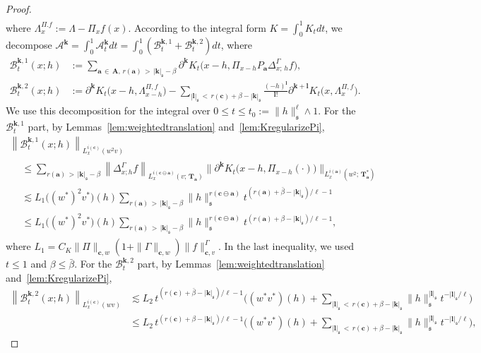 \documentclass[AHL,Unicode,longabstracts,published]{cedram}
\newcommand{\mfs}{\mathfrak{s}}
\newcommand{\wco}{w^*}
\newcommand{\vco}{v^*}
\newcommand{\bfa}{\mathbf{a}}
\newcommand{\bfc}{\mathbf{c}}
\newcommand{\bfcoa}{\mathbf{c}\ominus\mathbf{a}}
\newcommand{\bfA}{\mathbf{A}}
\newcommand{\bfT}{\mathbf{T}}
\newcommand{\bfk}{\mathbf{k}}
\newcommand{\bfl}{\mathbf{l}}
\newcommand{\mcA}{\mathcal{A}}
\newcommand{\mcB}{\mathcal{B}}
\begin{document}
\begin{proof}
\begin{align*}
\end{align*}
where $\Lambda_x^{\Pi.f}:=\Lambda-\Pi_xf(x)$. According to the integral form $K=\int_0^1K_tdt$, we decompose $\mcA^{\bfk}=\int_0^1\mcA_t^{\bfk}dt=\int_0^1(\mcB_t^{{\bfk},1}+\mcB_t^{{\bfk},2})dt$, where
\begin{align*}
\mcB_t^{{\bfk},1}(x;h)&:=\sum_{\bfa\,\in\, \bfA,\,r(\bfa)\,>\,|{\bfk}|_{\mfs}-\beta}\partial^{\bfk}K_t\big(x-h,\Pi_{x-h} P_\bfa\Delta_{x;\,h}^\Gamma f\big),\\
\mcB_t^{{\bfk},2}(x;h)&:=\partial^{\bfk}K_t\big(x-h, \Lambda_{x-h}^{\Pi,f}\big) -\sum_{|{\bfl}|_\mfs\,<\,r(\bfc)+\beta-|{\bfk}|_\mfs}\frac{(-h)^{\bfl}}{{\bfl}!}\partial^{{\bfk}+{\bfl}}K_t\big(x,\Lambda_x^{\Pi,f}\big).
\end{align*}
We use this decomposition for the integral over $0\le t\le t_0:=\|h\|_\mfs^\ell\wedge1$. For the $\mcB_t^{{\bfk},1}$ part, by Lemmas~\ref{lem:weightedtranslation} and~\ref{lem:KregularizePi},
\begin{multline*}
\left\|\mcB_t^{{\bfk},1}(x;h)\right\|_{L_x^{i(\bfc)}(w^2v)}\\
\begin{aligned}
 &\le\sum_{r(\bfa)\,>\,|{\bfk}|_{\mfs}-\beta}\left\|\Delta_{x;h}^\Gamma f\right\|_{L_x^{i(\bfcoa)}(v;\,\bfT_\bfa)}
\big\|\partial^{\bfk}K_t\big(x-h,\Pi_{x-h}(\cdot)\big)\big\|_{L_x^{i(\bfa)}\left(w^2;\,\bfT_\bfa^*\right)}\\
&\lesssim L_1\big((\wco)^2\vco\big)(h)
\sum_{r(\bfa)\,>\,|{\bfk}|_{\mfs}-\beta}\|h\|_{\mfs}^{r(\bfcoa)}t^{\left(r(\bfa)+\bar\beta-|{\bfk}|_{\mfs}\right)/\ell-1}\\
&\le L_1\big((\wco)^2\vco\big)(h)
\sum_{r(\bfa)\,>\,|{\bfk}|_{\mfs}-\beta}\|h\|_{\mfs}^{r(\bfcoa)}t^{\left(r(\bfa)+\beta-|{\bfk}|_{\mfs}\right)/\ell-1},
\end{aligned}
\end{multline*}
where $L_1=C_K\|\Pi\|_{\bfc,w}(1+\|\Gamma\|_{\bfc,w})\|f\|_{\bfc,v}^\Gamma$. In the last inequality, we used $t\le1$ and $\beta\le\bar\beta$. For the $\mcB_t^{{\bfk},2}$ part, by Lemmas~\ref{lem:weightedtranslation} and~\ref{lem:KregularizePi},
\begin{align*}
\left\|\mcB_t^{{\bfk},2}(x;h)\right\|_{L_x^{i(\bfc)}(wv)} &\lesssim L_2\,t^{\left(r(\bfc)+\bar\beta-|{\bfk}|_\mfs\right)/\ell-1}
\bigg((\wco\vco)(h)+\sum_{|{\bfl}|_\mfs\,<\,r(\bfc)+\beta-|{\bfk}|_\mfs}\|h\|_\mfs^{|{\bfl}|_\mfs}t^{-|{\bfl}|_\mfs/\ell}\bigg)\\
&\le L_2\,t^{\left(r(\bfc)+\beta-|{\bfk}|_\mfs\right)/\ell-1}
\bigg((\wco\vco)(h)+\sum_{|{\bfl}|_\mfs\,<\,r(\bfc)+\beta-|{\bfk}|_\mfs}\|h\|_\mfs^{|{\bfl}|_\mfs}t^{-|{\bfl}|_\mfs/\ell}\bigg),

\end{align*}
\end{proof}
\end{document}
